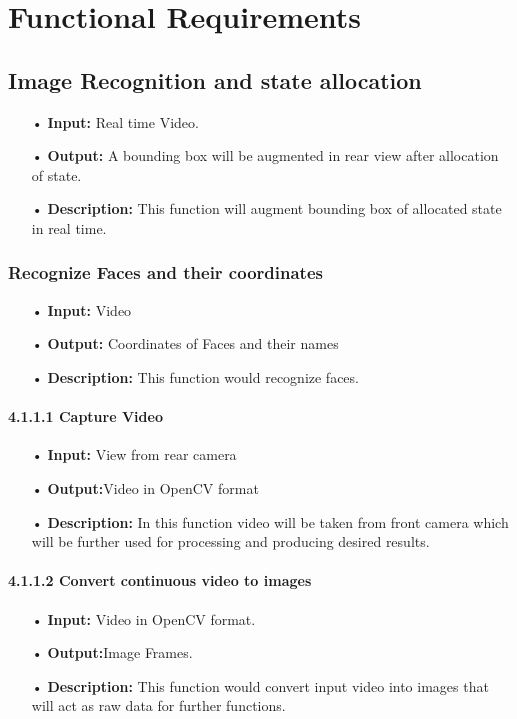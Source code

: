 \chapter{Functional Requirements}
\label{Functional Requirements}

\section{Image Recognition and state allocation}
\begin{enumerate}
\item[•] \textbf{Input:} Real time Video.
\item[•] \textbf{Output:} A bounding box will be augmented in rear view after allocation of state.
\item[•] \textbf{Description:} This function will augment bounding box of allocated state in real time.
\end{enumerate}

\subsection{Recognize Faces and their coordinates}
\begin{enumerate}
\item[•] \textbf{Input:} Video
\item[•] \textbf{Output:} Coordinates of Faces and their names
\item[•] \textbf{Description:} This function would recognize faces.
\end{enumerate}

\subsubsection{4.1.1.1 Capture Video}
\begin{enumerate}
\item[•] \textbf{Input:} View from rear camera
\item[•] \textbf{Output:}Video in OpenCV format
\item[•] \textbf{Description:} In this function video will be taken from front camera which will be further used for processing and producing desired results.
\end{enumerate}

\subsubsection{4.1.1.2 Convert continuous video to images}
\begin{enumerate}
\item[•] \textbf{Input:} Video in OpenCV format.
\item[•] \textbf{Output:}Image Frames.
\item[•] \textbf{Description:} This function would convert input video into images that will act as raw data for further functions.
\end{enumerate}

